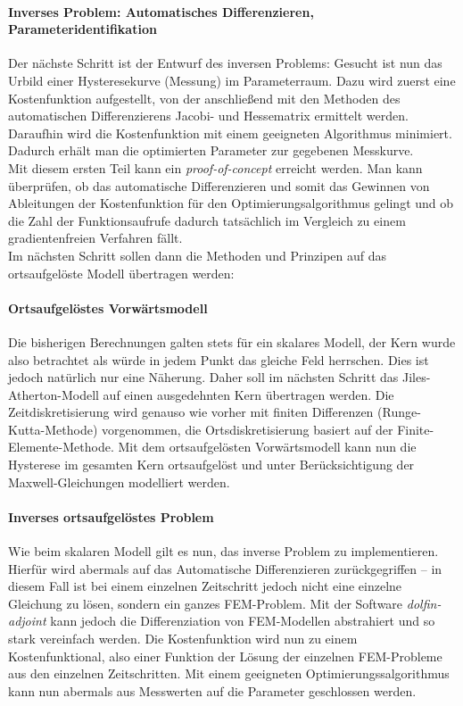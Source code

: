\documentclass{scrartcl}
\begin{document}
\paragraph{Inverses Problem: Automatisches Differenzieren, Parameteridentifikation} Der nächste Schritt ist der Entwurf des inversen Problems: Gesucht ist nun das Urbild einer Hysteresekurve (Messung) im Parameterraum. Dazu wird zuerst eine Kostenfunktion aufgestellt, von der anschließend mit den Methoden des automatischen Differenzierens Jacobi- und Hessematrix ermittelt werden. Daraufhin wird die Kostenfunktion mit einem geeigneten Algorithmus minimiert. Dadurch erhält man die optimierten Parameter zur gegebenen Messkurve.\\
Mit diesem ersten Teil kann ein \emph{proof-of-concept} erreicht werden. Man kann überprüfen, ob das automatische Differenzieren und somit das Gewinnen von Ableitungen der Kostenfunktion für den Optimierungsalgorithmus gelingt und ob die Zahl der Funktionsaufrufe dadurch tatsächlich im Vergleich zu einem gradientenfreien Verfahren fällt.\\
Im nächsten Schritt sollen dann die Methoden und Prinzipen auf das ortsaufgelöste Modell übertragen werden:
\paragraph{Ortsaufgelöstes Vorwärtsmodell}
Die bisherigen Berechnungen galten stets für ein skalares Modell, der Kern wurde also betrachtet als würde in jedem Punkt das gleiche Feld herrschen. Dies ist jedoch natürlich nur eine Näherung. Daher soll im nächsten Schritt das Jiles-Atherton-Modell auf einen ausgedehnten Kern übertragen werden. Die Zeitdiskretisierung wird genauso wie vorher mit finiten Differenzen (Runge-Kutta-Methode) vorgenommen, die Ortsdiskretisierung basiert auf der Finite-Elemente-Methode. Mit dem ortsaufgelösten Vorwärtsmodell kann nun die Hysterese im gesamten Kern ortsaufgelöst und unter Berücksichtigung der Maxwell-Gleichungen modelliert werden.
\paragraph{Inverses ortsaufgelöstes Problem}
Wie beim skalaren Modell gilt es nun, das inverse Problem zu implementieren. Hierfür wird abermals auf das Automatische Differenzieren zurückgegriffen -- in diesem Fall ist bei einem einzelnen Zeitschritt jedoch nicht eine einzelne Gleichung zu lösen, sondern ein ganzes FEM-Problem. Mit der Software \emph{dolfin-adjoint} kann jedoch die Differenziation von FEM-Modellen abstrahiert und so stark vereinfach werden. Die Kostenfunktion wird nun zu einem Kostenfunktional, also einer Funktion der Lösung der einzelnen FEM-Probleme aus den einzelnen Zeitschritten. Mit einem geeigneten Optimierungssalgorithmus kann nun abermals aus Messwerten auf die Parameter geschlossen werden.
\end{document}
